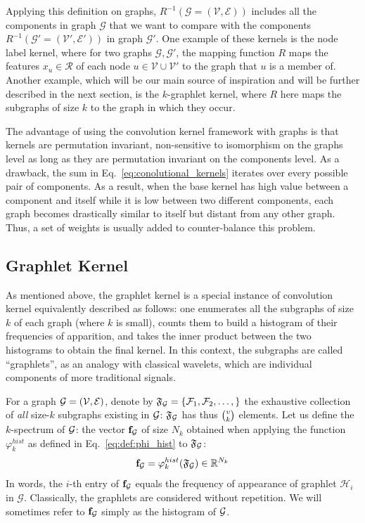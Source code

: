 Applying this definition on graphs, $R^{-1}(\mathcal{G}=(\mathcal{V},\mathcal{E}))$ includes all the components in graph $\mathcal{G}$  that we want to compare with the components $R^{-1}(\mathcal{G'}=(\mathcal{V}',\mathcal{E}'))$ in graph $\mathcal{G'}$. One example of these kernels is the node label kernel, where for two graphs $\mathcal{G}, \mathcal{G'}$, the mapping function $R$ maps the features $x_u\in \mathcal{R}$ of each node $u\in \mathcal{V}\cup \mathcal{V'}$ to the graph that $u$ is a member of. Another example, which will be our main source of inspiration and will be further described in the next section, is the $k$-graphlet kernel, where $R$ here maps the subgraphs of size $k$ to the graph in which they occur.

The advantage of using the convolution kernel framework with graphs is that kernels are permutation invariant, non-sensitive to isomorphism on the graphs level as long as they are permutation invariant on the components level. As a drawback, the sum in Eq.~\ref{eq:conolutional_kernels} iterates over every possible pair of components. As a result, when the base kernel has high value between a component and itself while it is low between two different components, each graph becomes drastically similar to itself but distant from any other graph. Thus, a set of weights is usually added to counter-balance this problem.

\subsection{Graphlet Kernel}
\label{subsection: graphlet kernel}

As mentioned above, the graphlet kernel is a special instance of convolution kernel equivalently described as follows: one enumerates all the subgraphs of size $k$ of each graph (where $k$ is small), counts them to build a histogram of their frequencies of apparition, and takes the inner product between the two histograms to obtain the final kernel. In this context, the subgraphs are called ``graphlets'', as an analogy with classical wavelets, which are individual components of more traditional signals.

For a graph $\mathcal{G}=(\mathcal{V},\mathcal{E})$, denote by $\mathfrak{F}_{\mathcal{G}}=\{\mathcal{F}_1,\mathcal{F}_2,\ldots,\}$ the exhaustive collection of \emph{all} size-$k$ subgraphs existing in $\mathcal{G}$: $\mathfrak{F}_{\mathcal{G}}$ has thus  $\tbinom{v}{k}$ elements. Let us define the $k$-spectrum of $\mathcal{G}$: the vector $\mathbf{f}_{\mathcal{G}}$ of size $N_k$ obtained when applying the function $\varphi_k^{hist}$ as defined in Eq.~\eqref{eq:def:phi_hist} to  $\mathfrak{F}_{\mathcal{G}}$:
\[
\mathbf{f}_{\mathcal{G}}=\varphi_k^{hist}(\mathfrak{F}_{\mathcal{G}}) \in\mathbb{R}^{N_k}
\]
In words, the $i$-th entry of $\mathbf{f}_{\mathcal{G}}$ equals the frequency of appearance of graphlet $\mathcal{H}_i$ in $\mathcal{G}$. Classically, the graphlets are considered without repetition. We will sometimes refer to $\mathbf{f}_{\mathcal{G}}$ simply as the histogram of $\mathcal{G}$. 

